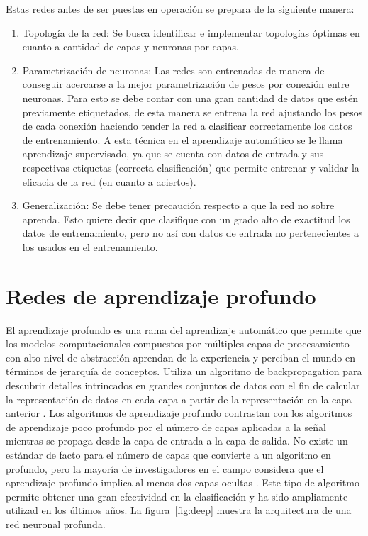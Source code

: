 Estas redes antes de ser puestas en operación se prepara de la siguiente manera:

\begin{enumerate}
\item Topología de la red: Se busca identificar e implementar topologías óptimas en cuanto a cantidad de capas y neuronas por capas.
\item Parametrización de neuronas: Las redes son entrenadas de manera de conseguir acercarse a la mejor parametrización de pesos por conexión entre neuronas. Para esto se debe contar con una gran cantidad de datos que estén previamente etiquetados, de esta manera se entrena la red ajustando los pesos de cada conexión haciendo tender la red a clasificar correctamente los datos de entrenamiento. A esta técnica en el aprendizaje automático se le llama aprendizaje supervisado, ya que se cuenta con datos de entrada y sus respectivas etiquetas (correcta clasificación) que permite entrenar y validar la eficacia de la red (en cuanto a aciertos).
\item Generalización: Se debe tener precaución respecto a que la red no sobre aprenda. Esto quiere decir que clasifique con un grado alto de exactitud los datos de entrenamiento, pero no así con datos de entrada no pertenecientes a los usados en el entrenamiento.
\end{enumerate}


\section{Redes de aprendizaje profundo}

El aprendizaje profundo es una rama del aprendizaje automático que permite que los modelos computacionales compuestos por múltiples capas de procesamiento con alto nivel de abstracción aprendan de la experiencia y perciban el mundo en términos de jerarquía de conceptos. Utiliza un algoritmo de backpropagation para descubrir detalles intrincados en grandes conjuntos de datos con el fin de calcular la representación de datos en cada capa a partir de la representación en la capa anterior \parencite{r36}. 
Los algoritmos de aprendizaje profundo contrastan con los algoritmos de aprendizaje poco profundo por el número de capas aplicadas a la señal mientras se propaga desde la capa de entrada a la capa de salida. No existe un estándar de facto para el número de capas que convierte a un algoritmo en profundo, pero la mayoría de investigadores en el campo considera que el aprendizaje profundo implica al menos dos capas ocultas \parencite{r2}. Este tipo de algoritmo permite obtener una gran efectividad en la clasificación y ha sido ampliamente utilizad en los últimos años. La figura~\ref{fig:deep} muestra la arquitectura de una red neuronal profunda.


